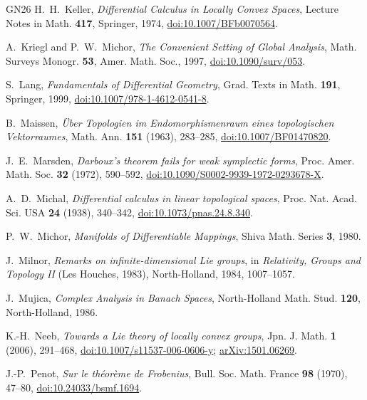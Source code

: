 \begin{thebibliography}{GN26}
H.~H.~Keller, \emph{Differential Calculus in Locally Convex Spaces}, Lecture Notes in Math.
\textbf{417}, Springer, 1974, \href{https://doi.org/10.1007/BFb0070564}{doi:10.1007/BFb0070564}.

A.~Kriegl and P.~W.~Michor, \emph{The Convenient Setting of Global Analysis}, Math. Surveys
Monogr. \textbf{53}, Amer. Math. Soc., 1997, \href{https://doi.org/10.1090/surv/053}{doi:10.1090/surv/053}.

S.~Lang, \emph{Fundamentals of Differential Geometry}, Grad. Texts in Math. \textbf{191},
Springer, 1999, \href{https://doi.org/10.1007/978-1-4612-0541-8}{doi:10.1007/978-1-4612-0541-8}.

B.~Maissen, \emph{Über Topologien im Endomorphismenraum eines topologischen Vektorraumes},
Math. Ann. \textbf{151} (1963), 283--285, \href{https://doi.org/10.1007/BF01470820}{doi:10.1007/BF01470820}.

J.~E.~Marsden, \emph{Darboux's theorem fails for weak symplectic forms}, Proc. Amer. Math. Soc.
\textbf{32} (1972), 590--592,
\href{https://doi.org/10.1090/S0002-9939-1972-0293678-X}{doi:10.1090/S0002-9939-1972-0293678-X}.

A.~D.~Michal, \emph{Differential calculus in linear topological spaces}, Proc. Nat. Acad. Sci.
USA \textbf{24} (1938), 340--342, \href{https://doi.org/10.1073/pnas.24.8.340}{doi:10.1073/pnas.24.8.340}.

P.~W.~Michor, \emph{Manifolds of Differentiable Mappings}, Shiva Math. Series \textbf{3}, 1980.

J.~Milnor, \emph{Remarks on infinite-dimensional Lie groups}, in \emph{Relativity, Groups and
Topology II} (Les Houches, 1983), North-Holland, 1984, 1007--1057.

J.~Mujica, \emph{Complex Analysis in Banach Spaces}, North-Holland Math. Stud. \textbf{120},
North-Holland, 1986.

K.-H.~Neeb, \emph{Towards a Lie theory of locally convex groups}, Jpn. J. Math. \textbf{1}
(2006), 291--468, \href{https://doi.org/10.1007/s11537-006-0606-y}{doi:10.1007/s11537-006-0606-y};
\href{https://arxiv.org/abs/1501.06269}{arXiv:1501.06269}.

J.-P.~Penot, \emph{Sur le théorème de Frobenius}, Bull. Soc. Math. France \textbf{98} (1970),
47--80, \href{https://doi.org/10.24033/bsmf.1694}{doi:10.24033/bsmf.1694}.


\end{thebibliography}
